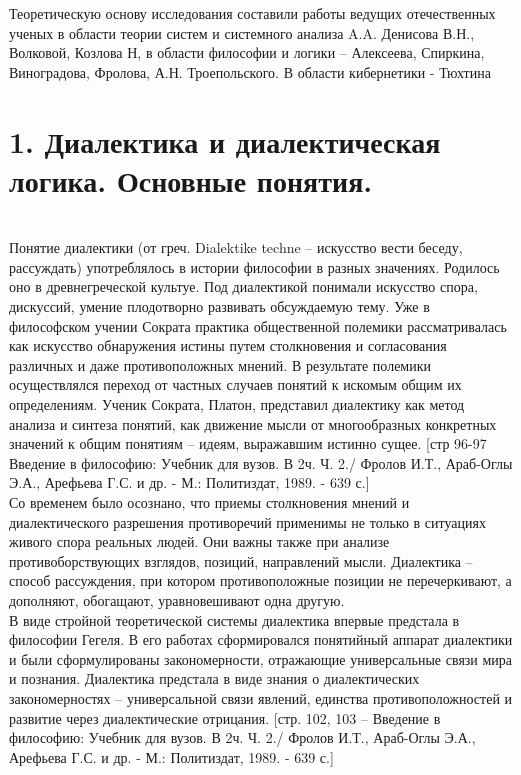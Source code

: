 \documentclass[a4paper,12pt]{report}
\begin{document}
	Теоретическую основу исследования составили работы ведущих отечественных ученых в области теории систем и системного анализа A.A. Денисова В.Н., Волковой, Козлова Н, в области философии и логики  – Алексеева, Спиркина, Виноградова, Фролова, А.Н. Троепольского. В области кибернетики - Тюхтина\\



\chapter*{1.  Диалектика и диалектическая логика. Основные понятия. }
 \\

Понятие диалектики (от греч. Dialektike techne – искусство вести беседу, рассуждать) употреблялось в истории философии в разных значениях. Родилось оно в древнегреческой культуе. Под диалектикой понимали искусство спора, дискуссий, умение плодотворно развивать обсуждаемую тему. Уже в философском учении Сократа практика общественной полемики рассматривалась как искусство обнаружения истины путем столкновения и согласования различных и даже противоположных мнений. В результате полемики осуществлялся переход от частных случаев понятий к искомым общим их определениям. Ученик Сократа, Платон, представил диалектику как метод анализа и синтеза понятий, как движение мысли от многообразных конкретных значений к общим понятиям – идеям, выражавшим истинно сущее. [стр 96-97  Введение в философию: Учебник для вузов. В 2ч. Ч. 2./ Фролов И.Т., Араб-Оглы Э.А., Арефьева Г.С. и др. - М.: Политиздат, 1989. - 639 с.] \\

	Со временем было осознано, что приемы столкновения мнений и диалектического разрешения противоречий применимы не только в ситуациях живого спора реальных людей. Они важны также при анализе противоборствующих взглядов, позиций, направлений мысли. Диалектика – способ рассуждения, при котором противоположные позиции не перечеркивают, а дополняют, обогащают, уравновешивают одна другую. \\

	В виде стройной теоретической системы диалектика впервые предстала в философии Гегеля. В его работах сформировался понятийный аппарат диалектики и были сформулированы закономерности, отражающие универсальные связи мира и познания. Диалектика предстала в виде знания о диалектических закономерностях – универсальной связи явлений, единства противоположностей и развитие через диалектические отрицания.  [стр. 102, 103 – Введение в философию: Учебник для вузов. В 2ч. Ч. 2./ Фролов И.Т., Араб-Оглы Э.А., Арефьева Г.С. и др. - М.: Политиздат, 1989. - 639 с.]\\
\end{document}
